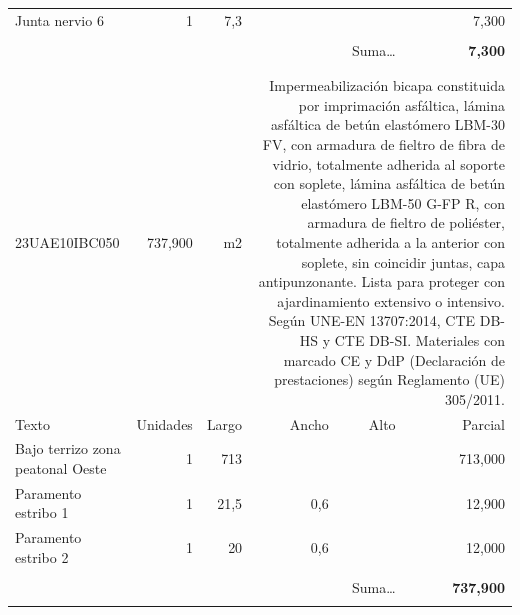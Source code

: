 \documentclass{book}%
\begin{document}
\begin{longtable}{lrrrrr}
\hline%
\multicolumn{1}{p{3.5cm}}{Junta nervio 6}&1&7,3&&&     7,300\\%
&&&&&\\%
\multicolumn{5}{r}{Suma\ldots}&\textbf{     7,300}\\%
\hline%
&&&&&\\%
&&&&&\\%
23UAE10IBC050&   737,900& m2&\multicolumn{3}{p{6cm}}{\scriptsize Impermeabilización bicapa constituida por imprimación asfáltica, lámina asfáltica de betún elastómero LBM-30 FV, con armadura de fieltro de fibra de vidrio, totalmente adherida al soporte con soplete, lámina asfáltica de betún elastómero LBM-50 G-FP R, con armadura de fieltro de poliéster, totalmente adherida a la anterior con soplete, sin coincidir juntas, capa antipunzonante. Lista para proteger con ajardinamiento extensivo o intensivo. Según UNE-EN 13707:2014, CTE DB-HS y CTE DB-SI. Materiales con marcado CE y DdP (Declaración de prestaciones) según Reglamento (UE) 305/2011.\normalsize}\\%
Texto&Unidades&Largo&Ancho&Alto&Parcial\\%
\hline%
\multicolumn{1}{p{3.5cm}}{Bajo terrizo zona peatonal Oeste }&1&713&&&   713,000\\%
\multicolumn{1}{p{3.5cm}}{Paramento estribo 1}&1&21,5&0,6&&    12,900\\%
\multicolumn{1}{p{3.5cm}}{Paramento estribo 2}&1&20&0,6&&    12,000\\%
&&&&&\\%
\multicolumn{5}{r}{Suma\ldots}&\textbf{   737,900}\\%
\hline%
&&&&&\\%
\end{longtable}%
\newpage

%
\end{document}
